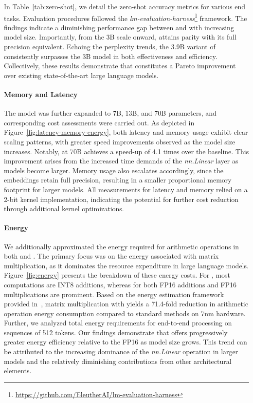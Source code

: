 In Table~\ref{tab:zero-shot}, we detail the zero-shot accuracy metrics for various end tasks. Evaluation procedures followed the \emph{lm-evaluation-harness}\footnote{\url{https://github.com/EleutherAI/lm-evaluation-harness}} framework. The findings indicate a diminishing performance gap between  and  with increasing model size. Importantly, from the 3B scale onward,  attains parity with its full precision equivalent. Echoing the perplexity trends, the 3.9B variant of  consistently surpasses the 3B  model in both effectiveness and efficiency. Collectively, these results demonstrate that  constitutes a Pareto improvement over existing state-of-the-art large language models.

\paragraph{Memory and Latency}

The model was further expanded to 7B, 13B, and 70B parameters, and corresponding cost assessments were carried out. As depicted in Figure~\ref{fig:latency-memory-energy}, both latency and memory usage exhibit clear scaling patterns, with greater speed improvements observed as the model size increases. Notably,  at 70B achieves a speed-up of 4.1 times over the  baseline. This improvement arises from the increased time demands of the \emph{nn.Linear} layer as models become larger. Memory usage also escalates accordingly, since the embeddings retain full precision, resulting in a smaller proportional memory footprint for larger models. All measurements for latency and memory relied on a 2-bit kernel implementation, indicating the potential for further cost reduction through additional kernel optimizations.

\paragraph{Energy}

We additionally approximated the energy required for arithmetic operations in both  and . The primary focus was on the energy associated with matrix multiplication, as it dominates the resource expenditure in large language models. Figure~\ref{fig:energy} presents the breakdown of these energy costs. For , most computations are INT8 additions, whereas for  both FP16 additions and FP16 multiplications are prominent. Based on the energy estimation framework provided in~\cite{energycost, pokebnn}, matrix multiplication with  yields a 71.4-fold reduction in arithmetic operation energy consumption compared to standard methods on 7nm hardware. Further, we analyzed total energy requirements for end-to-end processing on sequences of 512 tokens. Our findings demonstrate that  offers progressively greater energy efficiency relative to the FP16  as model size grows. This trend can be attributed to the increasing dominance of the \emph{nn.Linear} operation in larger models and the relatively diminishing contributions from other architectural elements.

